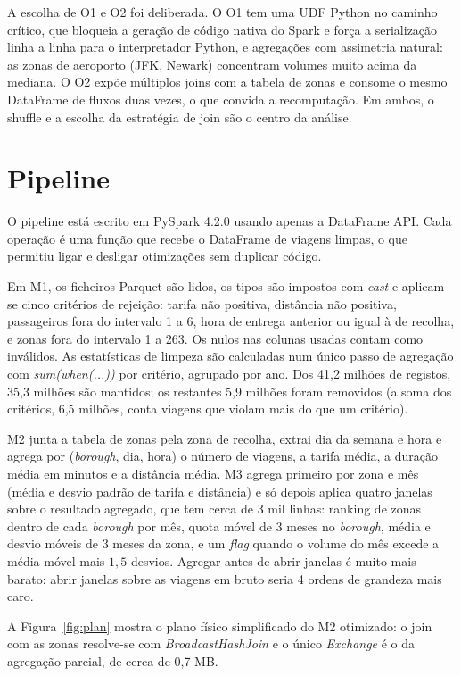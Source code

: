 \documentclass[sigconf]{acmart}
\begin{document}
A escolha de O1 e O2 foi deliberada. O O1 tem uma UDF Python no caminho
crítico, que bloqueia a geração de código nativa do Spark e força a
serialização linha a linha para o interpretador Python, e agregações
com assimetria natural: as zonas de aeroporto (JFK, Newark) concentram
volumes muito acima da mediana. O O2 expõe múltiplos joins com a tabela
de zonas e consome o mesmo DataFrame de fluxos duas vezes, o que convida
a recomputação. Em ambos, o shuffle e a escolha da estratégia de join
são o centro da análise.

\section{Pipeline}

O pipeline está escrito em PySpark 4.2.0 \cite{zaharia2010spark} usando
apenas a DataFrame API. Cada operação é uma função que recebe o DataFrame
de viagens limpas, o que permitiu ligar e desligar otimizações sem
duplicar código.

Em M1, os ficheiros Parquet são lidos, os tipos são impostos com
\emph{cast} e aplicam-se cinco critérios de rejeição: tarifa não
positiva, distância não positiva, passageiros fora do intervalo 1 a 6,
hora de entrega anterior ou igual à de recolha, e zonas fora do intervalo
1 a 263. Os nulos nas colunas usadas contam como inválidos. As
estatísticas de limpeza são calculadas num único passo de agregação com
\emph{sum(when(...))} por critério, agrupado por ano. Dos 41,2 milhões
de registos, 35,3 milhões são mantidos; os restantes 5,9 milhões foram
removidos (a soma dos critérios, 6,5 milhões, conta viagens que violam
mais do que um critério).

M2 junta a tabela de zonas pela zona de recolha, extrai dia da semana e
hora e agrega por (\emph{borough}, dia, hora) o número de viagens, a
tarifa média, a duração média em minutos e a distância média. M3 agrega
primeiro por zona e mês (média e desvio padrão de tarifa e distância) e
só depois aplica quatro janelas sobre o resultado agregado, que tem cerca
de 3 mil linhas: ranking de zonas dentro de cada \emph{borough} por mês,
quota móvel de 3 meses no \emph{borough}, média e desvio móveis de 3
meses da zona, e um \emph{flag} quando o volume do mês excede a média
móvel mais $1,5$ desvios. Agregar antes de abrir janelas é muito mais
barato: abrir janelas sobre as viagens em bruto seria 4 ordens de
grandeza mais caro.

A Figura~\ref{fig:plan} mostra o plano físico simplificado do M2
otimizado: o join com as zonas resolve-se com \emph{BroadcastHashJoin} e
o único \emph{Exchange} é o da agregação parcial, de cerca de 0,7 MB.
\end{document}
